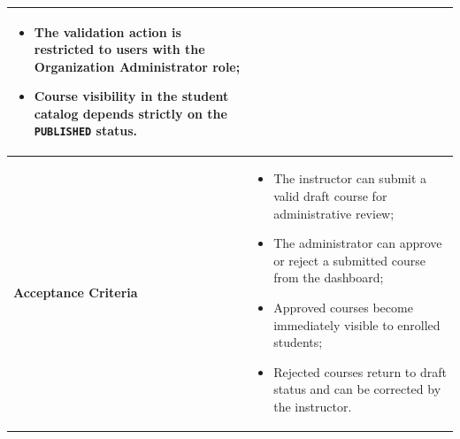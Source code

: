 \begin{table}[H]
\begin{tabularx}{\textwidth}{|p{2.5cm}|X|}
\begin{itemize}
  \item The validation action is restricted to users with the Organization Administrator role;
  \item Course visibility in the student catalog depends strictly on the \texttt{PUBLISHED} status.
\end{itemize} \\
\hline
\textbf{Acceptance Criteria} &
\begin{itemize}
  \item The instructor can submit a valid draft course for administrative review;
  \item The administrator can approve or reject a submitted course from the dashboard;
  \item Approved courses become immediately visible to enrolled students;
  \item Rejected courses return to draft status and can be corrected by the instructor.
\end{itemize} \\
\hline
\end{tabularx}
\end{table}

